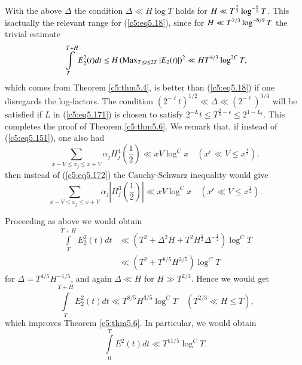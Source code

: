 With the above $\Delta$ the condition $\Delta \ll H \log T$ holds for 
$H \ll T^{\frac{2}{3}}\break \log^{-\frac{8}{9}} T$. 
This is\pageoriginale actually the relevant range for
(\ref{c5:eq5.18}), since for $H \ll T^{2/3}\break\log^{-8/9} T$ the
trivial estimate 
$$ 
\int\limits^{T+H}_T E^2_2(t) dt \leq H \left(\operatorname{Max}\limits_{T\leq t \leq
  2T} |E_2 (t)|\right)^2 \ll HT^{4/3} \log^{2C} T, 
$$
which comes from Theorem \ref{c5:thm5.4}, is better than
(\ref{c5:eq5.18}) if one disregards the log-factors. The condition
$(2^{-\ell}t)^{1/2} \ll \Delta \ll (2^{-\ell})^{3/4}$ will be
satisfied if $L$ in (\ref{c5:eq5.171}) is chosen to satisfy $2^{-L} t
\leq T^{\frac{3}{4} - \epsilon} \leq 2^{1-L_t}$. This completes the
proof of Theorem \ref{c5:thm5.6}. We remark that, if instead of
(\ref{c5:eq5.151}), one also had 
$$
\sum\limits_{x - V \leq x_j \leq x + V} \alpha_j H^4_j
\left(\frac{1}{2} \right) \ll x V \log^C x \quad \left(x^{\epsilon} \ll V
\leq x^{\frac{1}{2}}\right), 
$$
then instead of (\ref{c5:eq5.172}) the Cauchy-Schwarz inequality would
give 
$$
\sum\limits_{x - V\leq x_j \leq x + V} \alpha_j \left| H^3_j
\left(\frac{1}{2} \right)\right| \ll x V \log^C x \quad 
\left(x^{\epsilon} \ll V \leq x^{\frac{1}{2}}\right). 
$$

Proceeding as above we would obtain
\begin{align*}
\int\limits^{T+H}_T E^2_2 (t) dt  & \ll \left(T^2 + \Delta^2 H + T^2
H^{\frac{1}{2}} \Delta^{-\frac{1}{2}}\right) \log^C T\\ 
& \ll \left(T^2 + T^{8/5} H^{3/5}\right) \log^C T
\end{align*}
for $\Delta = T^{4/5} H^{-1/5}$, and again $\Delta \ll H$ for $H \gg
T^{2/3}$. Hence we would get  
$$
\int\limits^{T+H}_T E^2_2(t) dt \ll T^{8/5} H^{3/5} \log^C T \quad
\left(T^{2/3} \ll H \leq T\right),  
$$
which improves Theorem \ref{c5:thm5.6}. In particular, we would obtain 
$$
\int\limits^T_0 E^2 (t) dt \ll T^{11/5} \log^C T.
$$


